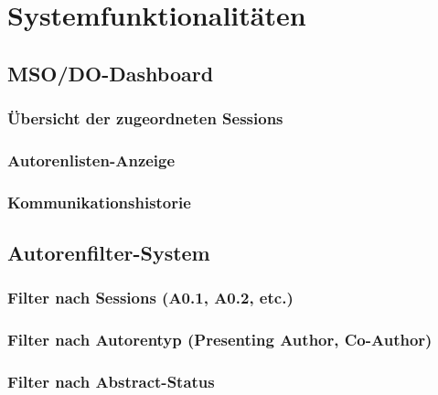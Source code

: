 \documentclass[11pt,a4paper]{article}
\begin{document}
\newpage
\section{Systemfunktionalitäten}

\subsection{MSO/DO-Dashboard}

\subsubsection{Übersicht der zugeordneten Sessions}

\subsubsection{Autorenlisten-Anzeige}

\subsubsection{Kommunikationshistorie}

\subsection{Autorenfilter-System}

\subsubsection{Filter nach Sessions (A0.1, A0.2, etc.)}

\subsubsection{Filter nach Autorentyp (Presenting Author, Co-Author)}

\subsubsection{Filter nach Abstract-Status}
\end{document}
